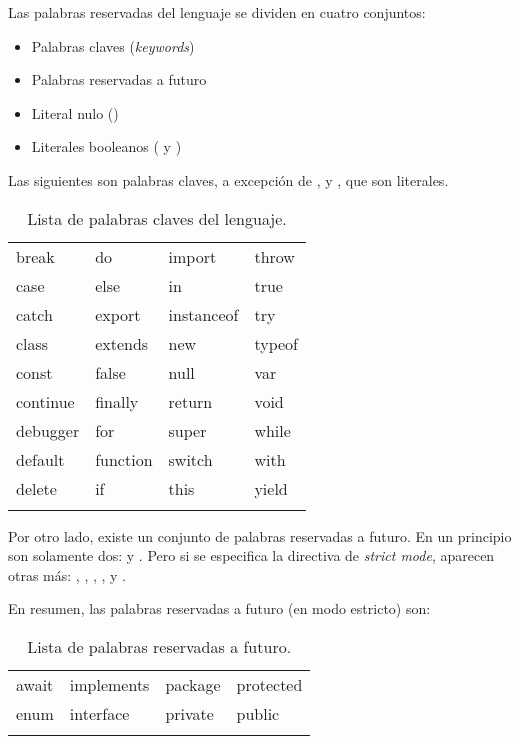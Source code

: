 Las palabras reservadas del lenguaje se dividen en cuatro conjuntos:

\begin{itemize}
\item Palabras claves (\textit{keywords})
\item Palabras reservadas a futuro
\item Literal nulo ()
\item Literales booleanos ( y )
\end{itemize}

Las siguientes son palabras claves, a excepción de ,  y , que son literales.

\begin{table}[!h]
\caption{Lista de palabras claves del lenguaje.}
\label{tab:reservedkeywords}
\centering
\begin{tabular}{l l l l}
\toprule
break & do & import & throw\\
case & else & in & true\\
catch & export & instanceof & try\\
class & extends & new & typeof\\
const & false & null & var\\
continue & finally & return & void\\
debugger & for & super & while\\
default & function & switch & with\\
delete & if & this & yield\\
\bottomrule\\
\end{tabular}
\end{table}

Por otro lado, existe un conjunto de palabras reservadas a futuro. En un principio son solamente dos:  y . Pero si se especifica la directiva de \textit{strict mode}, aparecen otras más: , , , ,  y .

En resumen, las palabras reservadas a futuro (en modo estricto) son:

\begin{table}[!h]
\caption{Lista de palabras reservadas a futuro.}
\label{tab:futurereservedkeywords}
\centering
\begin{tabular}{l l l l}
\toprule
await & implements & package & protected\\
enum & interface & private & public\\
\bottomrule\\
\end{tabular}
\end{table}


